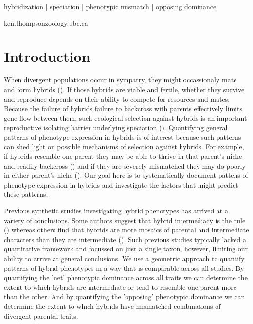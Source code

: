 \documentclass[times, twoside, watermark]{zHenriquesLab-StyleBioRxiv}
\begin{document}
\begin{keywords}
\noindent
hybridization | speciation | phenotypic mismatch | opposing dominance
\end{keywords}
\begin{corrauthor}
ken.thompson\at zoology.ubc.ca
\end{corrauthor}

\section*{Introduction}

When divergent populations occur in sympatry, they might occassionaly mate and form hybrids (\citealt{Mallett2005}). If those hybrids are viable and fertile, whether they survive and reproduce depends on their ability to compete for resources and mates. Because the failure of hybrids failure to backcross with parents effectively limits gene flow between them, such ecological selection against hybrids is an important reproductive isolating barrier underlying speciation (\citealt{Barton1985; @Gompert2017}). Quantifying general patterns of phenotype expression in hybrids is of interest because such patterns can shed light on possible mechanisms of selection against hybrids. For example, if hybrids resemble one parent they may be able to thrive in that parent's niche and readily backcross (\citealt{Mallett1986}) and if they are severely mismatched they may do poorly in either parent's niche (\citealt{Matsubayashi2010; @Arnegard2014; @Cooper2018}). Our goal here is to systematically document pattens of phenotype expression in hybrids and investigate the factors that might predict these patterns. \par

Previous synthetic studies investigating hybrid phenotypes has arrived at a variety of conclusions. Some authors suggest that hybrid intermediacy is the rule (\citealt{Hubbs1940}) whereas others find that hybrids are more mosaics of parental and intermediate characters than they are intermediate (\citealt{Rieseberg1993}). Such previous studies typically lacked a quantitative framework and focussed on just a single taxon, however, limiting our ability to arrive at general conclusions. We use a geometric approach to quantify patterns of hybrid phenotypes in a way that is comparable across all studies. By quantifying the 'net' phenotypic dominance across all traits we can determine the extent to which hybrids are intermediate or tend to resemble one parent more than the other. And by quantifying the 'opposing' phenotypic dominance we can determine the extent to which hybrids have mismatched combinations of divergent parental traits.
\end{document}
